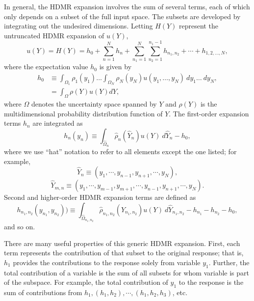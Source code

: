 In general, the HDMR expansion involves the sum of several terms, each of which only depends on a subset of
the full input space.  The subsets are developed by integrating out the undesired dimensions.  Letting $H(Y)$
represent the untruncated HDMR expansion of $u(Y)$,
\begin{equation}
  u(Y) = H(Y) = h_0 + \sum_{n=1}^N h_n + \sum_{n_1=1}^N \sum_{n_2=1}^{n_1-1} h_{n_1,n_2} + \cdots +
  h_{1,2,\ldots,N},
\end{equation}
where the expectation value $h_0$ is given by
\begin{align}\label{eq:hdmr 0}
  h_0 &\equiv \int_{\Omega_1} \rho_1(y_1)\ldots\int_{\Omega_N} \rho_N(y_N) u(y_1,\ldots,y_N)\ dy_1\ldots\ dy_N, \\
    &= \int_\Omega \rho(Y) u(Y) dY,
\end{align}
where $\Omega$ denotes the uncertainty space spanned by $Y$ and $\rho(Y)$ is the multidimensional probability distribution
function of $Y$. The first-order expansion terms $h_n$ are integrated as
\begin{equation}\label{eq:hdmr 1}
  h_n(y_n) \equiv \int_{\hat\Omega_n} \hat\rho_n(\hat Y_n) u(Y)\ d\hat Y_n - h_0,
\end{equation}
where we use ``hat'' notation to refer to all elements except the one listed; for example,
\begin{equation}
  \hat Y_n \equiv (y_1,\cdots,y_{n-1},y_{n+1},\cdots,y_N),
\end{equation}
\begin{equation}
  \hat Y_{m,n} \equiv (y_1,\cdots,y_{m-1},y_{m+1},\cdots,y_{n-1},y_{n+1},\cdots,y_N).
\end{equation}
Second and higher-order HDMR expansion terms are defined as
\begin{equation}\label{eq:hdmr 2}
  h_{n_1,n_2}(y_{n_1},y_{n_2})) \equiv \int_{\hat\Omega_{n_1,n_2}} \hat\rho_{n_1,n_2}(\hat Y_{n_1,n_2}) u(Y)\
      d\hat Y_{n_1,n_2} - h_{n_1} - h_{n_2} - h_0,
\end{equation}
and so on.

There are many useful properties of this generic HDMR expansion.  First, each term represents the contribution
of that subset to the original response; that is, $h_1$ provides the contributions to the response solely
from variable $y_1$.  Further, the total contribution of a variable is the sum of all subsets for whom
variable is part of the subspace.  For example, the total contribution of $y_1$ to the response is the sum of
contributions from $h_1,(h_1,h_2),\cdots,(h_1,h_2,h_3)$, etc.

